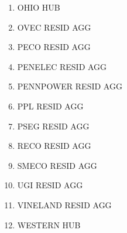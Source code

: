 \begin{multicols}{2}
{\begin{enumerate}
    \item OHIO HUB
    \item OVEC RESID AGG
    \item PECO RESID AGG
    \item PENELEC RESID AGG
    \item PENNPOWER RESID AGG
    \item PPL RESID AGG
    \item PSEG RESID AGG
    \item RECO RESID AGG
    \item SMECO RESID AGG
    \item UGI RESID AGG
    \item VINELAND RESID AGG
    \item WESTERN HUB
\end{enumerate}
}
\end{multicols}
